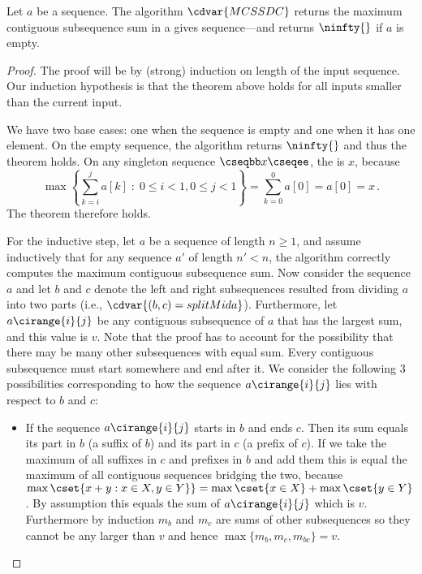 \begin{flex}
\begin{theorem}
  Let $a$ be a sequence. The algorithm $\cdvar{MCSSDC}$ returns the
  maximum contiguous subsequence sum in a gives sequence---and returns
  $\ninfty{}$ if $a$ is empty.
\end{theorem}

\begin{proof}
The proof will be by (strong) induction on length of the input
sequence.  Our induction hypothesis is that the theorem above holds
for all inputs smaller than the current input.
%

We have two base cases: one when the sequence is empty and one when it
has one element.  
%
On the empty sequence, the algorithm returns $\ninfty{}$ and thus the
theorem holds.
%
On any singleton sequence $\cseqbb x \cseqee$, the \MCSS{} is $x$,
because
\[
\max \left\{ \sum_{k=i}^j a[k] \;:\; 0 \leq i <
    1, 0 \leq j < 1 \right\} = \sum_{k=0}^0 a[0] = a[0] = x\,.
\]
%
The theorem therefore holds.

For the inductive step, let $a$ be a sequence of length $n \ge 1$, and
assume inductively that for any sequence $a'$ of length $n' < n$, the
algorithm correctly computes the maximum contiguous subsequence sum.
%
Now consider the sequence $a$ and let $b$ and $c$ denote the left and
right subsequences resulted from dividing $a$ into two parts (i.e.,
$\cdvar{(b, c) = splitMid a}$).  
%
Furthermore, let $a\cirange{i}{j}$ be any contiguous subsequence of $a$
that has the largest sum, and this value is $v$.  
%
Note that the proof has to account for the possibility that there may
be many other subsequences with equal sum.  
%
Every contiguous subsequence must start somewhere and end after it.
We consider the following $3$ possibilities corresponding to how the
sequence $a\cirange{i}{j}$ lies with respect to $b$ and $c$:

\begin{itemize}
\item 
If the sequence $a\cirange{i}{j}$ starts in $b$ and ends $c$. Then its
sum equals its part in $b$ (a suffix of $b$) and its part in $c$ (a
prefix of $c$).  
%
If we take the maximum of all suffixes in $c$ and
prefixes in $b$ and add them this is equal the maximum of all
contiguous sequences bridging the two, because $\max\cset{x + y : x
  \in X, y \in Y\}} = \max\cset{x \in X} + \max\cset{y \in Y}$. 
%
By assumption this equals the sum of $a\cirange{i}{j}$ which is $v$.
Furthermore by induction $m_b$ and $m_c$ are sums of other
subsequences so they cannot be any larger than $v$ and hence
$\max\{m_b, m_c, m_{bc}\} = v$.



\end{itemize}
\end{proof}
\end{flex}
